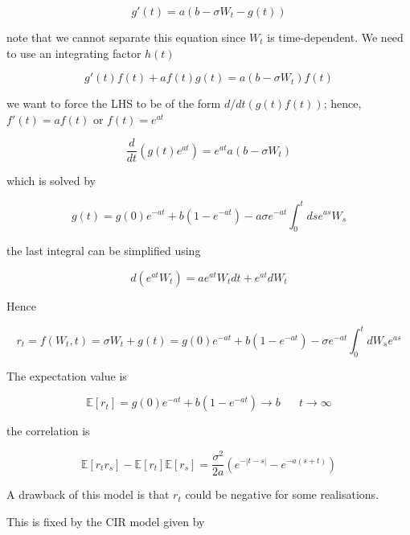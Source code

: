 \documentclass[11pt,a4paper]{article}
\begin{document}
\begin{equation*}
    g'(t) = a(b-\sigma W_t-g(t))
\end{equation*}

note that we cannot separate this equation since $W_t$ is time-dependent. We need to use an integrating factor $h(t)$

\begin{equation*}
g'(t)f(t)+af(t)g(t) = a(b-\sigma W_t)f(t)    
\end{equation*}

we want to force the LHS to be of the form $d/dt(g(t)f(t))$; hence, $f'(t) = a f(t)$ or $f(t) = e^{at}$ 

\begin{equation*}
    \frac{d}{dt}(g(t)e^{at}) = e^{at}a(b-\sigma W_t)
\end{equation*}

which is solved by

\begin{equation*}
    g(t) = g(0)e^{-at} + b(1-e^{-at}) - a \sigma e^{-at} \int_0^tdse^{as}W_s
\end{equation*}

the last integral can be simplified using

\begin{equation*}
    d(e^{at}W_t) = ae^{at}W_tdt+e^{at}dW_t
\end{equation*}

Hence

\begin{equation*}
    r_t = f(W_t,t) = \sigma W_t + g(t) = g(0)e^{-at} + b(1-e^{-at}) - \sigma e^{-at} \int_0^tdW_se^{as}
\end{equation*}

The expectation value is

\begin{equation*}
\mathbb{E}[r_t] =  g(0)e^{-at} + b(1-e^{-at}) \to b \hspace{20pt} t \to \infty
\end{equation*}

the correlation is

\begin{equation*}
\mathbb{E}[r_tr_s] -\mathbb{E}[r_t]\mathbb{E}[r_s] = \frac{\sigma^2}{2 a}(e^{-|t-s|}-e^{-a(s+t)})
\end{equation*}

A drawback of this model is that $r_t$ could be negative for some realisations. 

This is fixed by the CIR model given by
\end{document}
